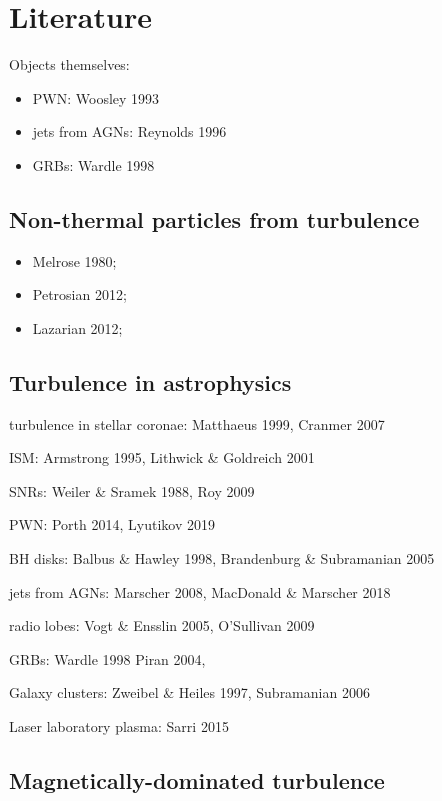 \documentclass[usenatbib,twocolumn]{aastex63}
\begin{document}
\section{Literature }\label{sect:literature}

Objects themselves:
\begin{itemize}
    \item PWN: Woosley 1993
    \item jets from AGNs: Reynolds 1996
    \item GRBs: Wardle 1998
\end{itemize}

\subsection{Non-thermal particles from turbulence}
\begin{itemize}
    \item Melrose 1980;
    \item Petrosian 2012;
    \item Lazarian 2012;
\end{itemize}

\subsection{Turbulence in astrophysics}

turbulence in stellar coronae:
Matthaeus 1999, Cranmer 2007

ISM:
Armstrong 1995, Lithwick \& Goldreich 2001

SNRs:
Weiler \& Sramek 1988, Roy 2009

PWN:
Porth 2014, Lyutikov 2019

BH disks:
Balbus \& Hawley 1998, Brandenburg \& Subramanian 2005

jets from AGNs:
Marscher 2008, MacDonald \& Marscher 2018
\citep{MacDonald_2018}

radio lobes:
Vogt \& Ensslin 2005, O'Sullivan 2009

GRBs:
Wardle 1998
Piran 2004, 
\citep{Kumar_2009}

Galaxy clusters:
Zweibel \& Heiles 1997, Subramanian 2006

Laser laboratory plasma:
Sarri 2015


\subsection{Magnetically-dominated turbulence}
\end{document}
